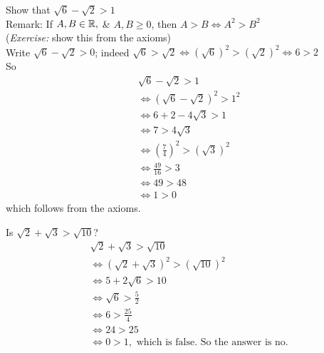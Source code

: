 \documentclass[10pt]{scrartcl}
\begin{document}
\begin{example} 
Show that $\sqrt{6} - \sqrt{2} > 1$\\

Remark: If $A, B \in \mathbb{R},$ \& $A,B \geq 0$, then $A >B \iff A^2 > B^2$ \\(\emph{Exercise:} show this from the axioms)\\

Write $\sqrt{6} - \sqrt{2} > 0 $; indeed $\sqrt{6} > \sqrt{2} \iff (\sqrt{6})^2 > (\sqrt{2})^2 \iff 6 > 2$\\

So 
\[\begin{aligned}
 &\sqrt{6} - \sqrt{2} > 1\\
&\iff (\sqrt{6} - \sqrt{2})^2 > 1^2 \\
& \iff 6 + 2 - 4\sqrt{3} > 1 \\
&\iff 7 > 4\sqrt{3} \\
& \iff (\frac{7}{4})^2 > (\sqrt{3})^2 \\
& \iff \frac{49}{16} > 3 \\
& \iff 49 > 48 \\
& \iff 1 > 0
\end{aligned}\]which follows from the axioms. 
\end{example}\vspace*{10pt}

\begin{example}
Is $\sqrt{2} + \sqrt{3} > \sqrt{10}$? 
\[
\begin{aligned}
  &\sqrt{2} + \sqrt{3} > \sqrt{10} \\
  &\iff (\sqrt{2} + \sqrt{3})^2 > (\sqrt{10})^2 \\
  &\iff 5 + 2\sqrt{6} > 10 \\
  &\iff \sqrt{6} > \frac{5}{2}\\
  &\iff 6 > \frac{25}{4} \\
  &\iff 24 > 25 \\
  &\iff 0 > 1, \text{ which is false. So the answer is no.}
\end{aligned}
\]
\end{example}\vspace*{10pt}
\end{document}
